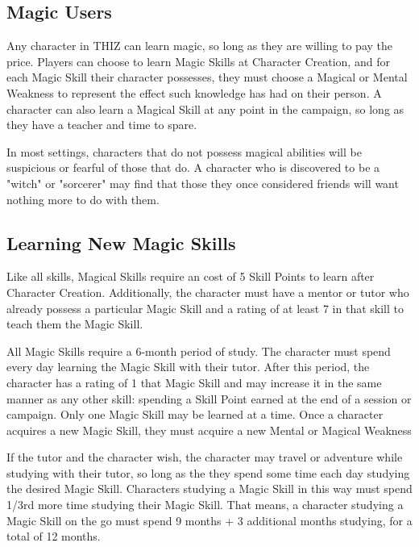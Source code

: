 \documentclass[oneside]{book}
\begin{document}
\begin{multicols}{2}
\subsection{Magic Users}
Any character in THIZ can learn magic, so long as they are willing to pay the price. Players can choose to learn Magic Skills at Character Creation, and for each Magic Skill their character possesses, they must choose a Magical or Mental Weakness to represent the effect such knowledge has had on their person. A character can also learn a Magical Skill at any point in the campaign, so long as they have a teacher and time to spare. 

In most settings, characters that do not possess magical abilities will be suspicious or fearful of those that do. A character who is discovered to be a "witch" or "sorcerer" may find that those they once considered friends will want nothing more to do with them.

\subsection{Learning New Magic Skills}
Like all skills, Magical Skills require an cost of 5 Skill Points to learn after Character Creation. Additionally, the character must have a mentor or tutor who already possess a particular Magic Skill and a rating of at least 7 in that skill to teach them the Magic Skill.

All Magic Skills require a 6-month period of study. The character must spend every day learning the Magic Skill with their tutor. After this period, the character has a rating of 1 that Magic Skill and may increase it in the same manner as any other skill: spending a Skill Point earned at the end of a session or campaign. Only one Magic Skill may be learned at a time. Once a character acquires a new Magic Skill, they must acquire a new Mental or Magical Weakness

If the tutor and the character wish, the character may travel or adventure while studying with their tutor, so long as the they spend some time each day studying the desired Magic Skill. Characters studying a Magic Skill in this way must spend 1/3rd more time studying their Magic Skill. That means, a character studying a Magic Skill on the go must spend 9 months + 3 additional months studying, for a total of 12 months. 


\end{multicols}
\end{document}
